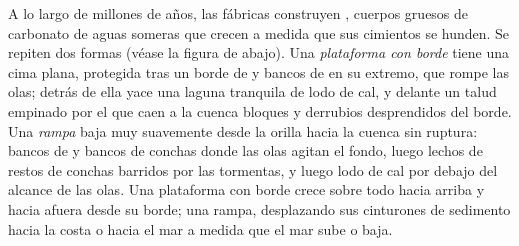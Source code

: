 A lo largo de millones de años, las fábricas construyen , cuerpos gruesos de carbonato de aguas someras que crecen a medida que sus cimientos se hunden. Se repiten
dos formas (véase la figura de abajo). Una \emph{plataforma con borde} tiene una cima plana, protegida tras un borde de  y bancos de  en su extremo, que rompe las olas; detrás
de ella yace una laguna tranquila de lodo de cal, y delante un talud empinado por el que caen a la cuenca bloques y derrubios desprendidos del borde. Una \emph{rampa} baja muy suavemente desde la
orilla hacia la cuenca sin ruptura: bancos de  y bancos de conchas donde las olas agitan el fondo, luego lechos de restos de conchas barridos por las tormentas, y luego lodo de cal por
debajo del alcance de las olas. Una plataforma con borde crece sobre todo hacia arriba y hacia afuera desde su borde; una rampa, desplazando sus cinturones de sedimento hacia la costa o hacia el mar
a medida que el mar sube o baja.

